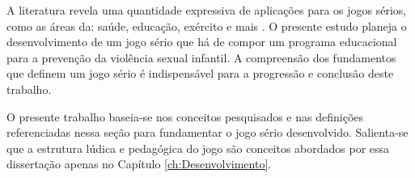 A literatura revela uma quantidade expressiva de aplicações para os jogos sérios, como as áreas da: saúde, educação, exército e mais \cite{zyda2005visual}. O presente estudo planeja o desenvolvimento de um jogo sério que há de compor um programa educacional para a prevenção da violência sexual infantil. A compreensão dos fundamentos que definem um jogo sério é indispensável para a progressão e conclusão deste trabalho. 

O presente trabalho baseia-se nos conceitos pesquisados e nas definições referenciadas nessa seção para fundamentar o jogo sério desenvolvido. Salienta-se que a estrutura lúdica e pedagógica do jogo são conceitos abordados por essa dissertação apenas no Capítulo \ref{ch:Desenvolvimento}.




\newpage





























